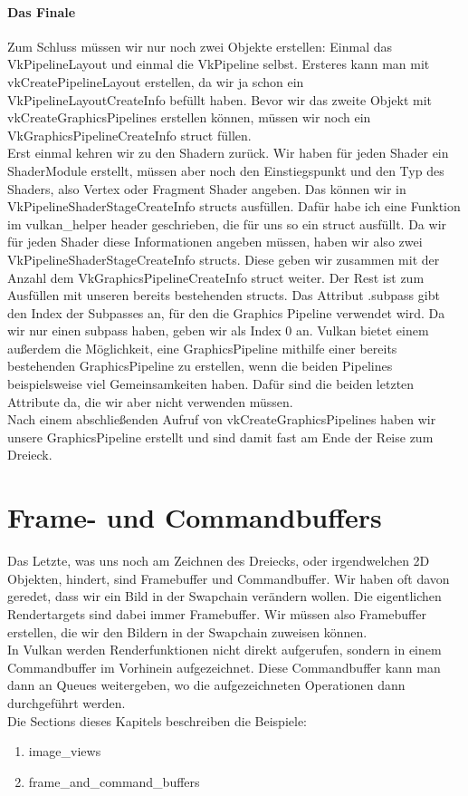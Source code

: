 \documentclass[11pt,a4paper]{report}
\begin{document}
\subsubsection{Das Finale}
Zum Schluss müssen wir nur noch zwei Objekte erstellen: Einmal das VkPipelineLayout und einmal die VkPipeline selbst. Ersteres kann man mit vkCreatePipelineLayout erstellen, da wir ja schon ein VkPipelineLayoutCreateInfo befüllt haben. Bevor wir das zweite Objekt mit vkCreateGraphicsPipelines erstellen können, müssen wir noch ein VkGraphicsPipelineCreateInfo struct füllen.\\
Erst einmal kehren wir zu den Shadern zurück. Wir haben für jeden Shader ein ShaderModule erstellt, müssen aber noch den Einstiegspunkt und den Typ des Shaders, also Vertex oder Fragment Shader angeben. Das können wir in VkPipelineShaderStageCreateInfo structs ausfüllen. Dafür habe ich eine Funktion im vulkan\_helper header geschrieben, die für uns so ein struct ausfüllt. Da wir für jeden Shader diese Informationen angeben müssen, haben wir also zwei VkPipelineShaderStageCreateInfo structs. Diese geben wir zusammen mit der Anzahl dem VkGraphicsPipelineCreateInfo struct weiter. Der Rest ist zum Ausfüllen mit unseren bereits bestehenden structs. Das Attribut .subpass gibt den Index der Subpasses an, für den die Graphics Pipeline verwendet wird. Da wir nur einen subpass haben, geben wir als Index 0 an. Vulkan bietet einem außerdem die Möglichkeit, eine GraphicsPipeline mithilfe einer bereits bestehenden GraphicsPipeline zu erstellen, wenn die beiden Pipelines beispielsweise viel Gemeinsamkeiten haben. Dafür sind die beiden letzten Attribute da, die wir aber nicht verwenden müssen.\\
Nach einem abschließenden Aufruf von vkCreateGraphicsPipelines haben wir unsere GraphicsPipeline erstellt und sind damit fast am Ende der Reise zum Dreieck.

\chapter{Frame- und Commandbuffers}
Das Letzte, was uns noch am Zeichnen des Dreiecks, oder irgendwelchen 2D Objekten, hindert, sind Framebuffer und Commandbuffer. Wir haben oft davon geredet, dass wir ein Bild in der Swapchain verändern wollen. Die eigentlichen Rendertargets sind dabei immer Framebuffer. Wir müssen also Framebuffer erstellen, die wir den Bildern in der Swapchain zuweisen können.\\
In Vulkan werden Renderfunktionen nicht direkt aufgerufen, sondern in einem Commandbuffer im Vorhinein aufgezeichnet. Diese Commandbuffer kann man dann an Queues weitergeben, wo die aufgezeichneten Operationen dann durchgeführt werden.\\
Die Sections dieses Kapitels beschreiben die Beispiele:
\begin{enumerate}
	\item{image\_views}
	\item{frame\_and\_command\_buffers}
\end{enumerate}
\end{document}
